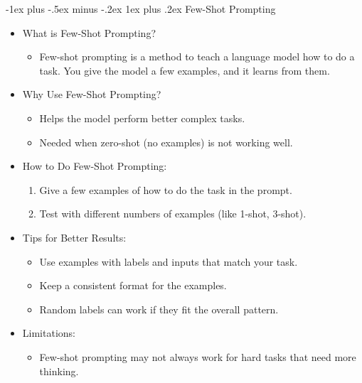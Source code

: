 \documentclass[10pt,landscape]{article}
\makeatletter
\renewcommand{\subsection}{\@startsection{subsection}{2}{0mm}%
                                {-1explus -.5ex minus -.2ex}%
                                {0.5ex plus .2ex}%
                                {\normalfont\normalsize\bfseries}}
\renewcommand{\subsection}{\@startsection{subsection}{3}{0mm}%
                                {-1ex plus -.5ex minus -.2ex}%
                                {1ex plus .2ex}%
                                {\normalfont\small\bfseries}}
\makeatother
\begin{document}
\begin{multicols}{3}
\subsection{Few-Shot Prompting}
\begin{itemize}
    \item What is Few-Shot Prompting?
    \begin{itemize}
        \item Few-shot prompting is a method to teach a language model how to do a task. You give the model a few examples, and it learns from them.
    \end{itemize}
    \item Why Use Few-Shot Prompting?
    \begin{itemize}
        \item Helps the model perform better complex tasks.
        \item Needed when zero-shot (no examples) is not working well.
    \end{itemize}
    \item How to Do Few-Shot Prompting:
    \begin{enumerate}
        \item Give a few examples of how to do the task in the prompt.
        \item Test with different numbers of examples (like 1-shot, 3-shot).
    \end{enumerate}
    \item Tips for Better Results:
    \begin{itemize}
        \item Use examples with labels and inputs that match your task.
        \item Keep a consistent format for the examples.
        \item Random labels can work if they fit the overall pattern.
    \end{itemize}
    \item Limitations:
    \begin{itemize}
        \item Few-shot prompting may not always work for hard tasks that need more thinking.
    \end{itemize}
\end{itemize}


\end{multicols}
\end{document}
